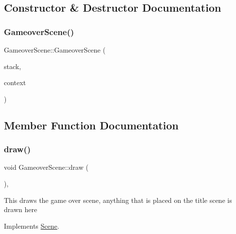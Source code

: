 \subsection{Constructor \& Destructor Documentation}
\mbox{\label{class_gameover_scene_a8d57771f3b59da589d2341d4d3b9d299}} 
\subsubsection{\texorpdfstring{Gameover\+Scene()}{GameoverScene()}}
{\footnotesize\ttfamily Gameover\+Scene\+::\+Gameover\+Scene (\begin{DoxyParamCaption}\item[{\hyperlink{class_scene_stack}{Scene\+Stack} \&}]{stack,  }\item[{\hyperlink{struct_scene_1_1_context}{Context}}]{context }\end{DoxyParamCaption})}



\subsection{Member Function Documentation}
\mbox{\label{class_gameover_scene_ae8a5e79e002d0e79edaec9ec1b0df902}} 
\subsubsection{\texorpdfstring{draw()}{draw()}}
{\footnotesize\ttfamily void Gameover\+Scene\+::draw (\begin{DoxyParamCaption}{ }\end{DoxyParamCaption})\hspace{0.3cm}{\ttfamily [override]}, {\ttfamily [virtual]}}

This draws the game over scene, anything that is placed on the title scene is drawn here 

Implements \hyperlink{class_scene_a789c16961aa1e316b2a4a05b95187546}{Scene}.

\mbox{\label{class_gameover_scene_ac951bc51d29e2d14807e3da2e885ccc8}} 
